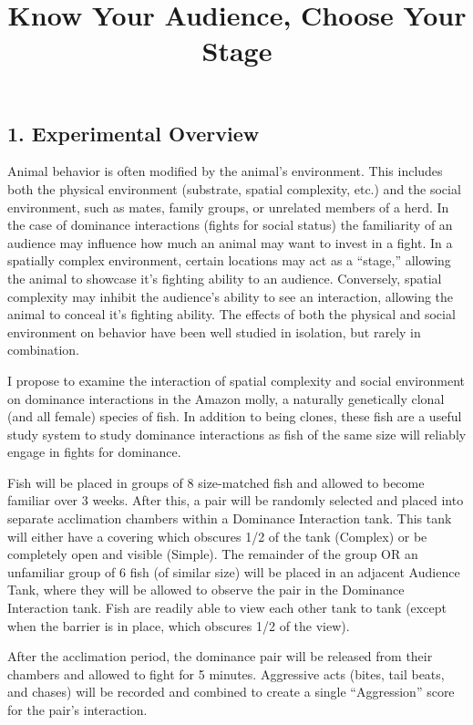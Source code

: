 \documentclass[
]{article}
\title{Know Your Audience, Choose Your Stage}
\author{}
\date{\vspace{-2.5em}}
\begin{document}
\maketitle

\hypertarget{experimental-overview}{%
\subsection{1. Experimental Overview}\label{experimental-overview}}

Animal behavior is often modified by the animal's environment. This
includes both the physical environment (substrate, spatial complexity,
etc.) and the social environment, such as mates, family groups, or
unrelated members of a herd. In the case of dominance interactions
(fights for social status) the familiarity of an audience may influence
how much an animal may want to invest in a fight. In a spatially complex
environment, certain locations may act as a ``stage,'' allowing the
animal to showcase it's fighting ability to an audience. Conversely,
spatial complexity may inhibit the audience's ability to see an
interaction, allowing the animal to conceal it's fighting ability. The
effects of both the physical and social environment on behavior have
been well studied in isolation, but rarely in combination.

I propose to examine the interaction of spatial complexity and social
environment on dominance interactions in the Amazon molly, a naturally
genetically clonal (and all female) species of fish. In addition to
being clones, these fish are a useful study system to study dominance
interactions as fish of the same size will reliably engage in fights for
dominance.

Fish will be placed in groups of 8 size-matched fish and allowed to
become familiar over 3 weeks. After this, a pair will be randomly
selected and placed into separate acclimation chambers within a
Dominance Interaction tank. This tank will either have a covering which
obscures 1/2 of the tank (Complex) or be completely open and visible
(Simple). The remainder of the group OR an unfamiliar group of 6 fish
(of similar size) will be placed in an adjacent Audience Tank, where
they will be allowed to observe the pair in the Dominance Interaction
tank. Fish are readily able to view each other tank to tank (except when
the barrier is in place, which obscures 1/2 of the view).

After the acclimation period, the dominance pair will be released from
their chambers and allowed to fight for 5 minutes. Aggressive acts
(bites, tail beats, and chases) will be recorded and combined to create
a single ``Aggression'' score for the pair's interaction.
\end{document}
